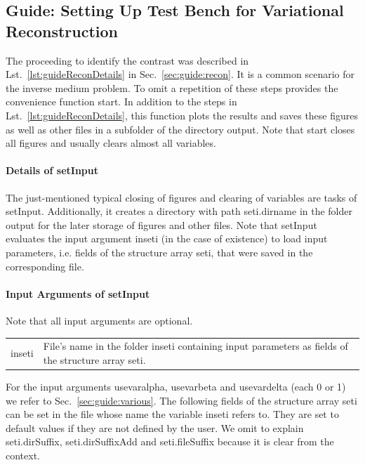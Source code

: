 \documentclass[a4paper]{article}
\begin{document}

\subsection{Guide: Setting Up Test Bench for Variational Reconstruction}\label{sec:guide:convenience}

The proceeding to identify the contrast was described in Lst.~\ref{lst:guideReconDetails} in Sec.~\ref{sec:guide:recon}. It is a common scenario for the inverse medium problem. To omit a repetition of these steps \IPscatt provides the convenience function \textsf{start}. In addition to the steps in Lst.~\ref{lst:guideReconDetails}, this function plots the results and saves these figures as well as other files in a subfolder of the directory \textsf{output}. Note that \textsf{start} closes all figures and usually clears almost all variables.

\paragraph{Details of \textsf{setInput}} The just-mentioned typical closing of figures and clearing of variables are tasks of \textsf{setInput}. Additionally, it creates a directory with path \textsf{seti.dirname} in the folder \textsf{output} for the later storage of figures and other files. Note that \textsf{setInput} evaluates the input argument \textsf{inseti} (in the case of existence) to load input parameters, i.e. fields of the structure array \textsf{seti}, that were saved in the corresponding file.

\paragraph{Input Arguments of \textsf{setInput}} Note that all input arguments are optional.

\noindent\begin{tabular}[t]{p{2.4cm} p{13.2cm}}
\textsf{inseti} & File's name in the folder \textsf{inseti} containing input parameters as fields of the structure array \textsf{seti}.
\end{tabular}

For the input arguments \textsf{usevaralpha}, \textsf{usevarbeta} and \textsf{usevardelta} (each 0 or 1) we refer to Sec.~\ref{sec:guide:various}. 
%
The following fields of the structure array \textsf{seti} can be set in the file whose name the variable \textsf{inseti} refers to. They are set to default values if they are not defined by the user. We omit to explain \textsf{seti.dirSuffix}, \textsf{seti.dirSuffixAdd} and \textsf{seti.fileSuffix} because it is clear from the context.
\end{document}
